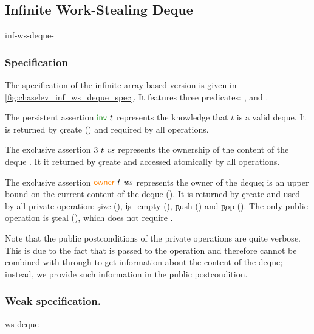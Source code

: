\subsection{Infinite Work-Stealing Deque}

\begin{tirPrefix}{inf-ws-deque-}

\subsubsection{Specification}

The specification of the infinite-array-based version is given in \cref{fig:chaselev_inf_ws_deque_spec}.
It features three predicates: \inv, \model and \owner.

The persistent assertion $\inv\ t$ represents the knowledge that $t$ is a valid deque.
It is returned by \c{create} () and required by all operations.

The exclusive assertion $\model\ t\ \zooVals$ represents the ownership of the content of the deque \zooVals.
It it returned by \c{create} and accessed atomically by all operations.

The exclusive assertion $\owner\ t\ \zooValsTwo$ represents the owner of the deque; \zooValsTwo is an upper bound on the current content of the deque ().
It is returned by \c{create} and used by all private operation: \c{size} (), \c{is\_empty} (), \c{push} () and \c{pop} ().
The only public operation is \c{steal} (), which does not require \owner.

Note that the public postconditions of the private operations are quite verbose.
This is due to the fact that \owner is passed to the operation and therefore cannot be combined with \model through  to get information about the content of the deque; instead, we provide such information in the public postcondition.



\subsubsection{Weak specification.}

\begin{tirPrefix}{ws-deque-}




\end{tirPrefix}
\end{tirPrefix}
